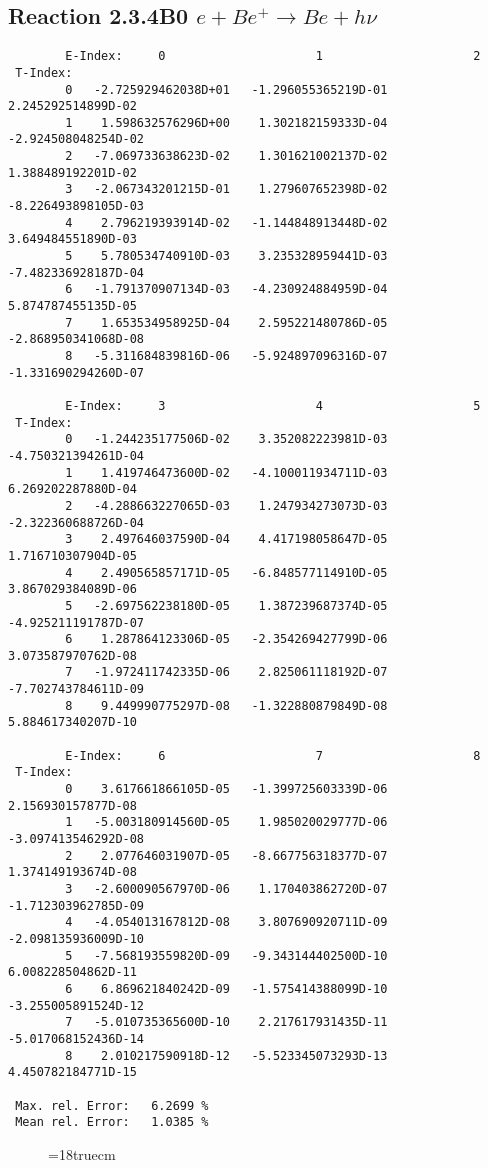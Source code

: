 \subsection{
Reaction 2.3.4B0  $e + Be^+ \rightarrow Be + h\nu$
}


\begin{verbatim}
        E-Index:     0                     1                     2
 T-Index:
        0   -2.725929462038D+01   -1.296055365219D-01    2.245292514899D-02
        1    1.598632576296D+00    1.302182159333D-04   -2.924508048254D-02
        2   -7.069733638623D-02    1.301621002137D-02    1.388489192201D-02
        3   -2.067343201215D-01    1.279607652398D-02   -8.226493898105D-03
        4    2.796219393914D-02   -1.144848913448D-02    3.649484551890D-03
        5    5.780534740910D-03    3.235328959441D-03   -7.482336928187D-04
        6   -1.791370907134D-03   -4.230924884959D-04    5.874787455135D-05
        7    1.653534958925D-04    2.595221480786D-05   -2.868950341068D-08
        8   -5.311684839816D-06   -5.924897096316D-07   -1.331690294260D-07

        E-Index:     3                     4                     5
 T-Index:
        0   -1.244235177506D-02    3.352082223981D-03   -4.750321394261D-04
        1    1.419746473600D-02   -4.100011934711D-03    6.269202287880D-04
        2   -4.288663227065D-03    1.247934273073D-03   -2.322360688726D-04
        3    2.497646037590D-04    4.417198058647D-05    1.716710307904D-05
        4    2.490565857171D-05   -6.848577114910D-05    3.867029384089D-06
        5   -2.697562238180D-05    1.387239687374D-05   -4.925211191787D-07
        6    1.287864123306D-05   -2.354269427799D-06    3.073587970762D-08
        7   -1.972411742335D-06    2.825061118192D-07   -7.702743784611D-09
        8    9.449990775297D-08   -1.322880879849D-08    5.884617340207D-10

        E-Index:     6                     7                     8
 T-Index:
        0    3.617661866105D-05   -1.399725603339D-06    2.156930157877D-08
        1   -5.003180914560D-05    1.985020029777D-06   -3.097413546292D-08
        2    2.077646031907D-05   -8.667756318377D-07    1.374149193674D-08
        3   -2.600090567970D-06    1.170403862720D-07   -1.712303962785D-09
        4   -4.054013167812D-08    3.807690920711D-09   -2.098135936009D-10
        5   -7.568193559820D-09   -9.343144402500D-10    6.008228504862D-11
        6    6.869621840242D-09   -1.575414388099D-10   -3.255005891524D-12
        7   -5.010735365600D-10    2.217617931435D-11   -5.017068152436D-14
        8    2.010217590918D-12   -5.523345073293D-13    4.450782184771D-15

 Max. rel. Error:   6.2699 %
 Mean rel. Error:   1.0385 %

\end{verbatim}
\begin{figure} \label{2.3.4B0}
\epsfxsize=18truecm
\end{figure}
\newpage

